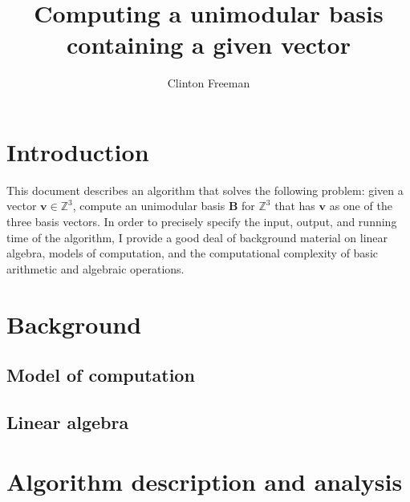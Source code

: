 \documentclass{article}
\newcommand{\mZ}[1]{\mathbb{Z}^{#1}}
\newcommand{\mVector}[1]{\mathbf{#1}}
\newcommand{\mVc}[1]{\mVector{#1}}
\newcommand{\mMatrix}[1]{\mathbf{#1}}
\newcommand{\mMt}[1]{\mMatrix{#1}}
\begin{document}
\title{Computing a unimodular basis containing a given vector}
\author{Clinton Freeman}

\maketitle

\section{Introduction}

This document describes an algorithm that solves the following problem:
given a vector $\mVc{v} \in \mZ{3}$, compute an unimodular basis $\mMt{B}$ for
$\mZ{3}$ that has $\mVc{v}$ as one of the three basis vectors. In order to
precisely specify the input, output, and running time of the algorithm, I
provide a good deal of background material on linear algebra, models of
computation, and the computational complexity of basic arithmetic and algebraic
operations. 

\section{Background}

\subsection{Model of computation}

\subsection{Linear algebra}

\section{Algorithm description and analysis}
\end{document}
